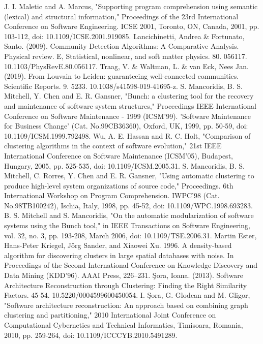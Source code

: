 \documentclass{ieeeaccess}
\begin{document}
\begin{thebibliography}{00}
 J. I. Maletic and A. Marcus, "Supporting program comprehension using semantic (lexical) and structural information," Proceedings of the 23rd International Conference on Software Engineering. ICSE 2001, Toronto, ON, Canada, 2001, pp. 103-112, doi: 10.1109/ICSE.2001.919085.
 Lancichinetti, Andrea \& Fortunato, Santo. (2009). Community Detection Algorithms: A Comparative Analysis. Physical review. E, Statistical, nonlinear, and soft matter physics. 80. 056117. 10.1103/PhysRevE.80.056117. 
 Traag, V. \& Waltman, L. \& van Eck, Nees Jan. (2019). From Louvain to Leiden: guaranteeing well-connected communities. Scientific Reports. 9. 5233. 10.1038/s41598-019-41695-z. 
 S. Mancoridis, B. S. Mitchell, Y. Chen and E. R. Gansner, "Bunch: a clustering tool for the recovery and maintenance of software system structures," Proceedings IEEE International Conference on Software Maintenance - 1999 (ICSM'99). 'Software Maintenance for Business Change' (Cat. No.99CB36360), Oxford, UK, 1999, pp. 50-59, doi: 10.1109/ICSM.1999.792498.
 Wu, A. E. Hassan and R. C. Holt, "Comparison of clustering algorithms in the context of software evolution," 21st IEEE International Conference on Software Maintenance (ICSM'05), Budapest, Hungary, 2005, pp. 525-535, doi: 10.1109/ICSM.2005.31.
 S. Mancoridis, B. S. Mitchell, C. Rorres, Y. Chen and E. R. Gansner, "Using automatic clustering to produce high-level system organizations of source code," Proceedings. 6th International Workshop on Program Comprehension. IWPC'98 (Cat. No.98TB100242), Ischia, Italy, 1998, pp. 45-52, doi: 10.1109/WPC.1998.693283.
 B. S. Mitchell and S. Mancoridis, "On the automatic modularization of software systems using the Bunch tool," in IEEE Transactions on Software Engineering, vol. 32, no. 3, pp. 193-208, March 2006, doi: 10.1109/TSE.2006.31. 
 Martin Ester, Hans-Peter Kriegel, Jörg Sander, and Xiaowei Xu. 1996. A density-based algorithm for discovering clusters in large spatial databases with noise. In Proceedings of the Second International Conference on Knowledge Discovery and Data Mining (KDD'96). AAAI Press, 226–231.
 Şora, Ioana. (2013). Software Architecture Reconstruction through Clustering: Finding the Right Similarity Factors. 45-54. 10.5220/0004599600450054. 
 I. Şora, G. Glodean and M. Gligor, "Software architecture reconstruction: An approach based on combining graph clustering and partitioning," 2010 International Joint Conference on Computational Cybernetics and Technical Informatics, Timisoara, Romania, 2010, pp. 259-264, doi: 10.1109/ICCCYB.2010.5491289.

\end{thebibliography}
\end{document}
